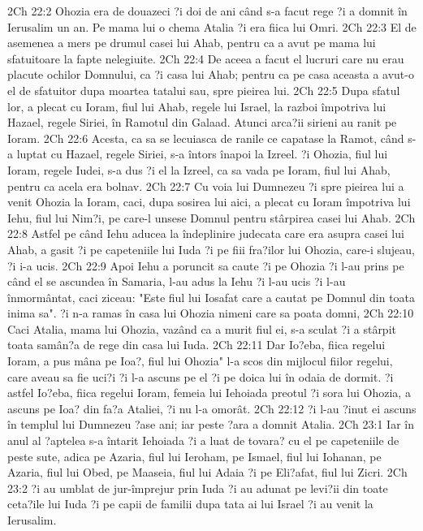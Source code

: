 2Ch 22:2  Ohozia era de douazeci ?i doi de ani când s-a facut rege ?i a domnit în Ierusalim un an. Pe mama lui o chema Atalia ?i era fiica lui Omri.
2Ch 22:3  El de asemenea a mers pe drumul casei lui Ahab, pentru ca a avut pe mama lui sfatuitoare la fapte nelegiuite.
2Ch 22:4  De aceea a facut el lucruri care nu erau placute ochilor Domnului, ca ?i casa lui Ahab; pentru ca pe casa aceasta a avut-o el de sfatuitor dupa moartea tatalui sau, spre pieirea lui.
2Ch 22:5  Dupa sfatul lor, a plecat cu Ioram, fiul lui Ahab, regele lui Israel, la razboi împotriva lui Hazael, regele Siriei, în Ramotul din Galaad. Atunci arca?ii sirieni au ranit pe Ioram.
2Ch 22:6  Acesta, ca sa se lecuiasca de ranile ce capatase la Ramot, când s-a luptat cu Hazael, regele Siriei, s-a întors înapoi la Izreel. ?i Ohozia, fiul lui Ioram, regele Iudei, s-a dus ?i el la Izreel, ca sa vada pe Ioram, fiul lui Ahab, pentru ca acela era bolnav.
2Ch 22:7  Cu voia lui Dumnezeu ?i spre pieirea lui a venit Ohozia la Ioram, caci, dupa sosirea lui aici, a plecat cu Ioram împotriva lui Iehu, fiul lui Nim?i, pe care-l unsese Domnul pentru stârpirea casei lui Ahab.
2Ch 22:8  Astfel pe când Iehu aducea la îndeplinire judecata care era asupra casei lui Ahab, a gasit ?i pe capeteniile lui Iuda ?i pe fiii fra?ilor lui Ohozia, care-i slujeau, ?i i-a ucis.
2Ch 22:9  Apoi Iehu a poruncit sa caute ?i pe Ohozia ?i l-au prins pe când el se ascundea în Samaria, l-au adus la Iehu ?i l-au ucis ?i l-au înmormântat, caci ziceau: "Este fiul lui Iosafat care a cautat pe Domnul din toata inima sa". ?i n-a ramas în casa lui Ohozia nimeni care sa poata domni,
2Ch 22:10  Caci Atalia, mama lui Ohozia, vazând ca a murit fiul ei, s-a sculat ?i a stârpit toata samân?a de rege din casa lui Iuda.
2Ch 22:11  Dar Io?eba, fiica regelui Ioram, a pus mâna pe Ioa?, fiul lui Ohozia" l-a scos din mijlocul fiilor regelui, care aveau sa fie uci?i ?i l-a ascuns pe el ?i pe doica lui în odaia de dormit. ?i astfel Io?eba, fiica regelui Ioram, femeia lui Iehoiada preotul ?i sora lui Ohozia, a ascuns pe Ioa? din fa?a Ataliei, ?i nu l-a omorât.
2Ch 22:12  ?i l-au ?inut ei ascuns în templul lui Dumnezeu ?ase ani; iar peste ?ara a domnit Atalia.
2Ch 23:1  Iar în anul al ?aptelea s-a întarit Iehoiada ?i a luat de tovara? cu el pe capeteniile de peste sute, adica pe Azaria, fiul lui Ieroham, pe Ismael, fiul lui Iohanan, pe Azaria, fiul lui Obed, pe Maaseia, fiul lui Adaia ?i pe Eli?afat, fiul lui Zicri.
2Ch 23:2  ?i au umblat de jur-împrejur prin Iuda ?i au adunat pe levi?ii din toate ceta?ile lui Iuda ?i pe capii de familii dupa tata ai lui Israel ?i au venit la Ierusalim.
